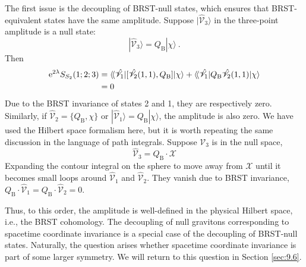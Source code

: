 The first issue is the decoupling of BRST-null states, which ensures that BRST-equivalent states have the same amplitude.
Suppose $|\hat{\mathscr{V}}_{3}\rangle$ in the three-point amplitude is a null state:
\begin{equation}
	|\hat{\mathscr{V}}_{3}\rangle=Q_{\mathrm{B}}|\chi\rangle \:. \label{9.1.7}
\end{equation}
Then
\begin{align}
	\mathrm{e}^{2 \lambda} S_{S_{2}}(1; 2; 3) 
	&=  \langle\!\langle \hat{\mathscr{V}}_{1} |
	[\hat{\mathscr{V}}_{2}(1,1), Q_{\mathrm{B}}] |\chi\rangle        
	+\langle\!\langle \hat{\mathscr{V}}_{1} |
	Q_{\mathrm{B}} \hat{\mathscr{V}}_{2}(1,1) |\chi\rangle \nonumber \\
	&=0 \label{9.1.8}
\end{align}
Due to the BRST invariance of states 2 and 1, they are respectively zero. Similarly, if $\hat{\mathscr{V}}_{2}= \{Q_{\mathrm{B}}, \chi\}$ or 
$|\hat{\mathscr{V}}_{1}\rangle= Q_{\mathrm{B}}|\chi\rangle$, the amplitude is also zero. We have used the Hilbert space formalism here, 
but it is worth repeating the same discussion in the language of path integrals.
Suppose $\mathscr{V}_{3}$ is in the null space,
\begin{equation}
	\hat{\mathscr{V}}_{3}=Q_{\mathrm{B}} \cdot \mathscr{X}
\end{equation}
Expanding the contour integral on the sphere to move away from $\mathscr{X}$ until it becomes small loops around $\hat{\mathscr{V}}_{1}$ and $\hat{\mathscr{V}}_{2}$. 
They vanish due to BRST invariance, $Q_{\mathrm{B}} \cdot \hat{\mathscr{V}}_{1}=Q_{\mathrm{B}} \cdot \hat{\mathscr{V}}_{2}=0$.

Thus, to this order, the amplitude is well-defined in the physical Hilbert space, i.e., the BRST cohomology.
The decoupling of null gravitons corresponding to spacetime coordinate invariance is a special case of the decoupling of BRST-null states. 
Naturally, the question arises whether spacetime coordinate invariance is part of some larger symmetry. We will return to this question in Section \ref{sec:9.6}. 

